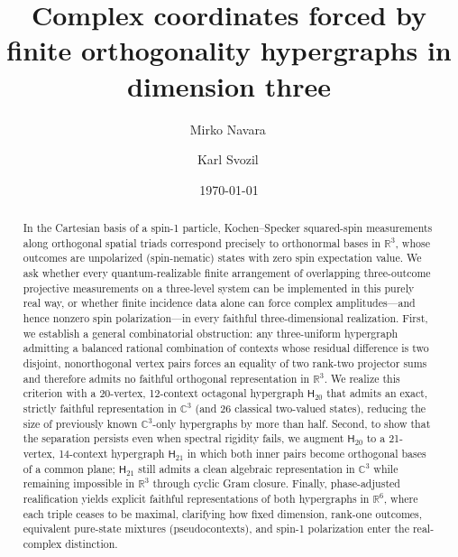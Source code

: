 \documentclass[twocolumn,aps,pra,floatfix,amsmath,amssymb,longbibliography]{revtex4-2}
\newenvironment{handrewrite}{\leavevmode\color{blue}}{}
\theoremstyle{definition}
\theoremstyle{remark}
\newcommand{\C}{\mathbb C}
\newcommand{\R}{\mathbb R}
\newcommand{\Htwenty}{\mathsf H_{20}}
\newcommand{\Htwentyone}{\mathsf H_{21}}
\begin{document}
\title{Complex coordinates forced by finite orthogonality hypergraphs in dimension three}

\author{Mirko Navara\,}

\author{Karl Svozil\,}

\date{\today}

\begin{abstract}
\begin{handrewrite}
In the Cartesian basis of a spin-1 particle, Kochen--Specker squared-spin measurements along orthogonal spatial triads correspond precisely to orthonormal bases in $\R^3$, whose outcomes are unpolarized (spin-nematic) states with zero spin expectation value.  We ask whether every quantum-realizable finite arrangement of overlapping three-outcome projective measurements on a three-level system can be implemented in this purely real way, or whether finite incidence data alone can force complex amplitudes---and hence nonzero spin polarization---in every faithful three-dimensional realization.  First, we establish a general combinatorial obstruction: any three-uniform hypergraph admitting a balanced rational combination of contexts whose residual difference is two disjoint, nonorthogonal vertex pairs forces an equality of two rank-two projector sums and therefore admits no faithful orthogonal representation in $\R^3$.  We realize this criterion with a 20-vertex, 12-context octagonal hypergraph $\Htwenty$ that admits an exact, strictly faithful representation in $\C^3$ (and 26 classical two-valued states), reducing the size of previously known $\C^3$-only hypergraphs by more than half.  Second, to show that the separation persists even when spectral rigidity fails, we augment $\Htwenty$ to a 21-vertex, 14-context hypergraph $\Htwentyone$ in which both inner pairs become orthogonal bases of a common plane; $\Htwentyone$ still admits a clean algebraic representation in $\C^3$ while remaining impossible in $\R^3$ through cyclic Gram closure.  Finally, phase-adjusted realification yields explicit faithful representations of both hypergraphs in $\R^6$, where each triple ceases to be maximal, clarifying how fixed dimension, rank-one outcomes, equivalent pure-state mixtures (pseudocontexts), and spin-1 polarization enter the real-complex distinction.
\end{handrewrite}
\end{abstract}
\end{document}
